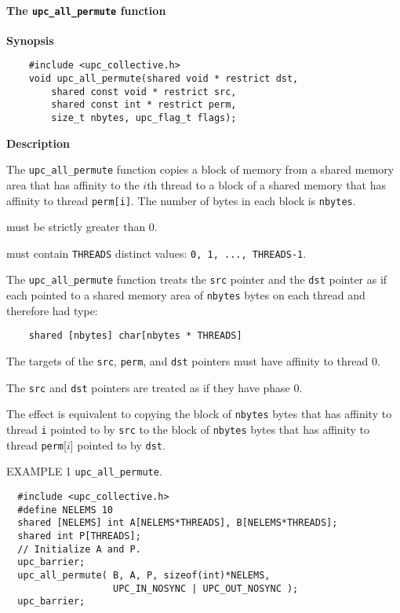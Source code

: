 \paragraph{The {\tt upc\_all\_permute} function}

{\bf Synopsis} 

\npf\vspace{-2.5em}
\begin{verbatim}
    #include <upc_collective.h>
    void upc_all_permute(shared void * restrict dst,
        shared const void * restrict src, 
        shared const int * restrict perm,
        size_t nbytes, upc_flag_t flags);
\end{verbatim}

{\bf Description} 

\np The {\tt upc\_all\_permute} function copies a block of memory from a
shared memory area that has affinity to the $i$th thread to a block of a
shared memory that has affinity to thread {\tt perm[i]}.
The number of bytes in each block is {\tt nbytes}.

 must be strictly greater than 0.

 must contain {\tt THREADS} distinct
values: {\tt 0, 1, ...,  THREADS-1}.

\np The {\tt upc\_all\_permute} function treats the {\tt src} pointer
and the {\tt dst} pointer as if each pointed to a shared memory
area of {\tt nbytes} bytes on each thread and therefore had type:

\begin{verbatim}
    shared [nbytes] char[nbytes * THREADS]
\end{verbatim}  

\np The targets of the {\tt src}, {\tt perm}, and
{\tt dst} pointers must have affinity to thread 0.

\np The {\tt src} and {\tt dst} pointers are treated as
if they have phase 0.

\np The effect is equivalent to copying the block of {\tt nbytes} bytes
that has affinity to thread {\tt i} pointed to by {\tt src}
to the block of {\tt nbytes} bytes
that has affinity to thread {\tt perm}[$i$] pointed to by {\tt dst}.


\np EXAMPLE 1 {\tt upc\_all\_permute}.
\begin{verbatim}
  #include <upc_collective.h>
  #define NELEMS 10
  shared [NELEMS] int A[NELEMS*THREADS], B[NELEMS*THREADS];
  shared int P[THREADS];
  // Initialize A and P.
  upc_barrier;
  upc_all_permute( B, A, P, sizeof(int)*NELEMS,
                   UPC_IN_NOSYNC | UPC_OUT_NOSYNC );
  upc_barrier;
\end{verbatim}

